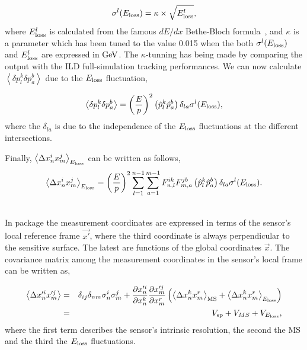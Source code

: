\begin{equation}
  \label{eq:sigmaEloss}
  \sigma^{l}(E_{\rm loss}) = \kappa \times \sqrt{E^l_{\rm loss}},
\end{equation}
\noindent
where ${E^l_{\rm loss}}$ is calculated from the famous $dE/dx$ Bethe-Bloch formula~\cite{bib:MS_angle}, and $\kappa$ is a parameter which has been tuned to the value 0.015 
when the both $\sigma^{l}(E_{\rm loss})$ and $E^l_{\rm loss}$ are expressed in ${\rm GeV}$. The $\kappa$-tunning has being made by comparing the {\guari} output with the ILD 
full-simulation tracking performances. We can now calculate $\left< \delta p^{k}_{l} \delta p^{b}_{a} \right>$ due to the $E_{\rm loss}$ fluctuation,

\begin{equation}
  \left< \delta p^{k}_{l} \delta p^{b}_{a} \right> = \left( \frac{E}{p} \right)^2 \left(\hat{p}^{k}_{l}\hat{p}^{b}_{a}\right)\delta_{la}\sigma^{l}(E_{\rm loss}),
\end{equation}
\noindent
where the $\delta_{la}$ is due to the independence of the $E_{\rm loss}$ fluctuations at the different intersections.

Finally, $\left<  \Delta x^i_n x^j_m \right >_{E_{\rm loss}}$ can be written as follows,
\begin{equation}
  \left<  \Delta x^i_n x^j_m \right >_{E_{\rm loss}} = \left( \frac{E}{p} \right)^2 \sum^{n-1}_{l=1}\sum^{m-1}_{a=1} F^{ik}_{n,l} F^{jb}_{m,a} \left(\hat{p}^k_l\hat{p}^b_{a}\right) \delta_{la} \sigma^{l}(E_{\rm loss}).
\end{equation}


~\\
\noindent
In {\guari} package the measurement coordinates are expressed in terms of the sensor's local reference frame $\vec{x'}$, where the third coordinate is always perpendicular to the sensitive surface. 
The latest are functions of the global coordinates $\vec{x}$. The covariance matrix among the measurement coordinates in the sensor's local frame can be written as,

\begin{eqnarray}
  \left<  \Delta x'^i_n x'^j_m \right > &=& \delta_{ij}\delta_{nm}\sigma^i_n\sigma^j_m + \frac{\partial x'^i_n}{\partial x^k_n} \frac{\partial x'^j_m}{\partial x^r_m} \left( \left<  \Delta x^k_n x^r_m \right >_{\rm MS} + \left<  \Delta x^k_n x^r_m \right >_{E_{\rm loss}} \right) \\
                                        &=& V_{\rm sp} + V_{MS} + V_{E_{\rm loss}},
\end{eqnarray}
\noindent
where the first term describes the sensor's intrinsic resolution, the second the MS and the third the $E_{\rm loss}$ fluctuations.

